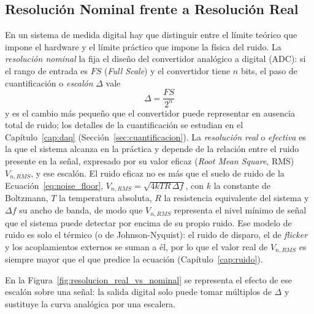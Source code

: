 \subsection{Resolución Nominal frente a Resolución Real}\label{sec:resolucion_real_vs_nominal}

En un sistema de medida digital hay que distinguir entre el límite teórico que impone el hardware y el límite práctico que impone la física del ruido. La \emph{resolución nominal} la fija el diseño del convertidor analógico a digital (ADC): si el rango de entrada es $FS$ (\textit{Full Scale}) y el convertidor tiene $n$ bits, el paso de cuantificación o \emph{escalón} $\Delta$ vale
\begin{equation}\label{eq:resolucion_nominal}
    \Delta = \frac{FS}{2^n}
\end{equation}
y es el cambio más pequeño que el convertidor puede representar en ausencia total de ruido; los detalles de la cuantificación se estudian en el Capítulo~\ref{cap:daq} (Sección~\ref{sec:cuantificacion}). La \emph{resolución real} o \emph{efectiva} es la que el sistema alcanza en la práctica y depende de la relación entre el ruido presente en la señal, expresado por su valor eficaz (\textit{Root Mean Square}, RMS) $V_{n,RMS}$, y ese escalón. El ruido eficaz no es más que el suelo de ruido de la Ecuación~\eqref{eq:noise_floor}, $V_{n,RMS} = \sqrt{4kTR\,\Delta f}$, con $k$ la constante de Boltzmann, $T$ la temperatura absoluta, $R$ la resistencia equivalente del sistema y $\Delta f$ su ancho de banda, de modo que $V_{n,RMS}$ representa el nivel mínimo de señal que el sistema puede detectar por encima de su propio ruido. Ese modelo de ruido es solo el térmico (o de Johnson-Nyquist): el ruido de disparo, el de \textit{flicker} y los acoplamientos externos se suman a él, por lo que el valor real de $V_{n,RMS}$ es siempre mayor que el que predice la ecuación (Capítulo~\ref{cap:ruido}).

En la Figura~\ref{fig:resolucion_real_vs_nominal} se representa el efecto de ese escalón sobre una señal: la salida digital solo puede tomar múltiplos de $\Delta$ y sustituye la curva analógica por una escalera.

